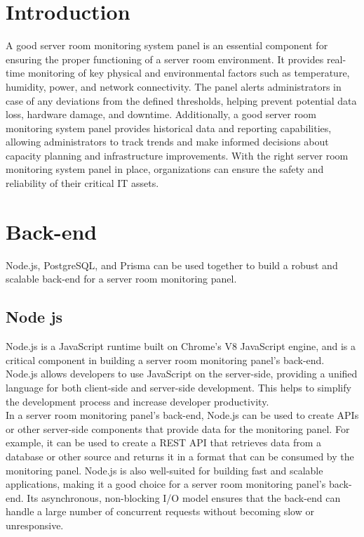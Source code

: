 \section{Introduction}
A good server room monitoring system panel is an essential component for ensuring the proper functioning of a server room environment. It provides real-time monitoring of key physical and environmental factors such as temperature, humidity, power, and network connectivity. The panel alerts administrators in case of any deviations from the defined thresholds, helping prevent potential data loss, hardware damage, and downtime. Additionally, a good server room monitoring system panel provides historical data and reporting capabilities, allowing administrators to track trends and make informed decisions about capacity planning and infrastructure improvements. With the right server room monitoring system panel in place, organizations can ensure the safety and reliability of their critical IT assets.
\section{Back-end}
Node.js, PostgreSQL, and Prisma can be used together to build a robust and scalable back-end for a server room monitoring panel.
    \subsection{Node js} 
    Node.js is a JavaScript runtime built on Chrome's V8 JavaScript engine, and is a critical component in building a server room monitoring panel's back-end. Node.js allows developers to use JavaScript on the server-side, providing a unified language for both client-side and server-side development. This helps to simplify the development process and increase developer productivity.\\
    In a server room monitoring panel's back-end, Node.js can be used to create APIs or other server-side components that provide data for the monitoring panel. For example, it can be used to create a REST API that retrieves data from a database or other source and returns it in a format that can be consumed by the monitoring panel. Node.js is also well-suited for building fast and scalable applications, making it a good choice for a server room monitoring panel's back-end. Its asynchronous, non-blocking I/O model ensures that the back-end can handle a large number of concurrent requests without becoming slow or unresponsive.
